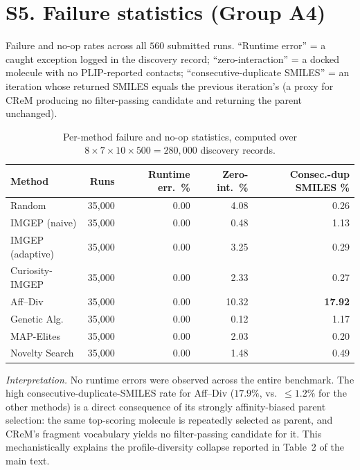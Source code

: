 \documentclass[journal=jcisd8,manuscript=suppinfo]{achemso}
\begin{document}
\clearpage

\section*{S5. Failure statistics (Group A4)}

Failure and no-op rates across all $560$ submitted runs. ``Runtime error'' = a caught exception logged in the discovery record; ``zero-interaction'' = a docked molecule with no PLIP-reported contacts; ``consecutive-duplicate SMILES'' = an iteration whose returned SMILES equals the previous iteration's (a proxy for CReM producing no filter-passing candidate and returning the parent unchanged).

\begin{table}[ht]
\centering
\caption{Per-method failure and no-op statistics, computed over $8 \times 7 \times 10 \times 500 = 280{,}000$ discovery records.}
\label{tab:failures}
\small
\begin{tabular}{lrrrr}
\toprule
\textbf{Method} & \textbf{Runs} & \textbf{Runtime err.\ \%} & \textbf{Zero-int.\ \%} & \textbf{Consec.-dup SMILES \%} \\
\midrule
Random           & 35{,}000 & 0.00 & 4.08  & 0.26 \\
IMGEP (naive)    & 35{,}000 & 0.00 & 0.48  & 1.13 \\
IMGEP (adaptive) & 35{,}000 & 0.00 & 3.25  & 0.29 \\
Curiosity-IMGEP  & 35{,}000 & 0.00 & 2.33  & 0.27 \\
Aff--Div         & 35{,}000 & 0.00 & 10.32 & \textbf{17.92} \\
Genetic Alg.     & 35{,}000 & 0.00 & 0.12  & 1.17 \\
MAP-Elites       & 35{,}000 & 0.00 & 2.03  & 0.20 \\
Novelty Search   & 35{,}000 & 0.00 & 1.48  & 0.49 \\
\bottomrule
\end{tabular}
\end{table}

\emph{Interpretation.} No runtime errors were observed across the entire benchmark. The high consecutive-duplicate-SMILES rate for Aff--Div ($17.9\%$, vs.\ $\leq 1.2\%$ for the other methods) is a direct consequence of its strongly affinity-biased parent selection: the same top-scoring molecule is repeatedly selected as parent, and CReM's fragment vocabulary yields no filter-passing candidate for it. This mechanistically explains the profile-diversity collapse reported in Table~2 of the main text.
\end{document}
